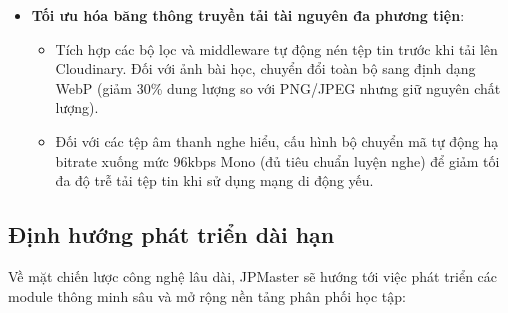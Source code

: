 \documentclass[../DoAn.tex]{subfiles}
\begin{document}
\begin{itemize}
    \item \textbf{Tối ưu hóa băng thông truyền tải tài nguyên đa phương tiện}:
    \begin{itemize}
        \item Tích hợp các bộ lọc và middleware tự động nén tệp tin trước khi tải lên Cloudinary. Đối với ảnh bài học, chuyển đổi toàn bộ sang định dạng WebP (giảm 30\% dung lượng so với PNG/JPEG nhưng giữ nguyên chất lượng).
        \item Đối với các tệp âm thanh nghe hiểu, cấu hình bộ chuyển mã tự động hạ bitrate xuống mức 96kbps Mono (đủ tiêu chuẩn luyện nghe) để giảm tối đa độ trễ tải tệp tin khi sử dụng mạng di động yếu.
    \end{itemize}
\end{itemize}

\subsection{Định hướng phát triển dài hạn}
Về mặt chiến lược công nghệ lâu dài, JPMaster sẽ hướng tới việc phát triển các module thông minh sâu và mở rộng nền tảng phân phối học tập:
\end{document}
